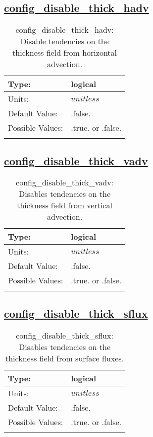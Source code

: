 \subsection[config\_disable\_thick\_hadv]{\hyperref[sec:nm_tab_debug]{config\_disable\_thick\_hadv}}
\label{subsec:nm_sec_config_disable_thick_hadv}
\begin{center}
\begin{longtable}{| p{2.0in} || p{4.0in} |}
    \hline
    Type: & logical \\
    \hline
    Units: & $unitless$ \\
    \hline
    Default Value: & .false. \\
    \hline
    Possible Values: & .true. or .false. \\
    \hline
    \caption{config\_disable\_thick\_hadv: Disable tendencies on the thickness field from horizontal advection.}
\end{longtable}
\end{center}
\subsection[config\_disable\_thick\_vadv]{\hyperref[sec:nm_tab_debug]{config\_disable\_thick\_vadv}}
\label{subsec:nm_sec_config_disable_thick_vadv}
\begin{center}
\begin{longtable}{| p{2.0in} || p{4.0in} |}
    \hline
    Type: & logical \\
    \hline
    Units: & $unitless$ \\
    \hline
    Default Value: & .false. \\
    \hline
    Possible Values: & .true. or .false. \\
    \hline
    \caption{config\_disable\_thick\_vadv: Disables tendencies on the thickness field from vertical advection.}
\end{longtable}
\end{center}
\subsection[config\_disable\_thick\_sflux]{\hyperref[sec:nm_tab_debug]{config\_disable\_thick\_sflux}}
\label{subsec:nm_sec_config_disable_thick_sflux}
\begin{center}
\begin{longtable}{| p{2.0in} || p{4.0in} |}
    \hline
    Type: & logical \\
    \hline
    Units: & $unitless$ \\
    \hline
    Default Value: & .false. \\
    \hline
    Possible Values: & .true. or .false. \\
    \hline
    \caption{config\_disable\_thick\_sflux: Disables tendencies on the thickness field from surface fluxes.}
\end{longtable}
\end{center}
